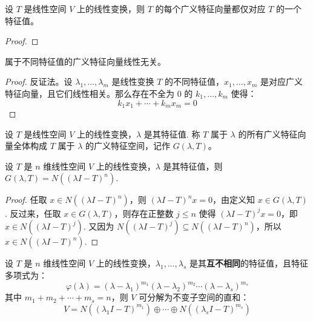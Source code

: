 \begin{theorem}[广义特征向量对应特征值的唯一性]
设 $T$ 是线性空间 $V$ 上的线性变换，则 $T$ 的每个广义特征向量都仅对应 $T$ 的一个特征值。
\end{theorem}
\begin{proof}
{\color{red}{TODO}}
\end{proof}

\begin{theorem}[广义特征向量的线性无关性]
属于不同特征值的广义特征向量线性无关。
\end{theorem}
\begin{proof}
反证法。设 $\lambda_1,\ldots,\lambda_m$ 是线性变换 $T$ 的不同特征值，$x_1,\ldots,x_m$ 是对应广义特征向量，且它们线性相关。那么存在不全为 0 的 $k_1,\ldots,k_m$ 使得：
\[
    k_1x_1+\cdots+k_mx_m=0
\]
{\color{red}{TODO}}
\end{proof}

\begin{definition}[广义特征空间]
设 $T$ 是线性空间 $V$ 上的线性变换，$\lambda$ 是其特征值. 称 $T$ 属于 $\lambda$ 的所有广义特征向量全体构成 $T$ 属于 $\lambda$ 的广义特征空间，记作 $G(\lambda,T)$。
\end{definition}

\begin{theorem}[广义特征空间的刻画]
设 $T$ 是 $n$ 维线性空间 $V$ 上的线性变换，$\lambda$ 是其特征值，则 $G(\lambda,T)=N((\lambda I-T)^n)$.
\end{theorem}
\begin{proof}
任取 $x\in N((\lambda I-T)^n)$，则 $(\lambda I-T)^nx=0$，由定义知 $x\in G(\lambda, T)$. 反过来，任取 $x\in G(\lambda,T)$，则存在正整数 $j\leq n$ 使得 $(\lambda I-T)^jx=0$，即 $x\in N((\lambda I-T)^j)$. 又因为 $N((\lambda I-T)^j)\subseteq N((\lambda I-T)^n)$，所以 $x\in N((\lambda I-T)^n)$.
\end{proof}

\begin{corollary}[基于广义特征空间的直和分解]
\label{cor:directsum}
设 $T$ 是 $n$ 维线性空间 $V$ 上的线性变换，$\lambda_1,\ldots,\lambda_s$ 是其\textbf{互不相同}的特征值，且特征多项式为：
\[
    \varphi(\lambda)=(\lambda-\lambda_1)^{m_1}(\lambda-\lambda_2)^{m_2}\cdots(\lambda-\lambda_s)^{m_s}
\]
其中 $m_1+m_2+\cdots+m_s=n$，则 $V$ 可分解为不变子空间的直和：
\[
    V=N((\lambda_1 I-T)^{m_1})\oplus\cdots\oplus N((\lambda_s I-T)^{m_s})
\]
\end{corollary}


